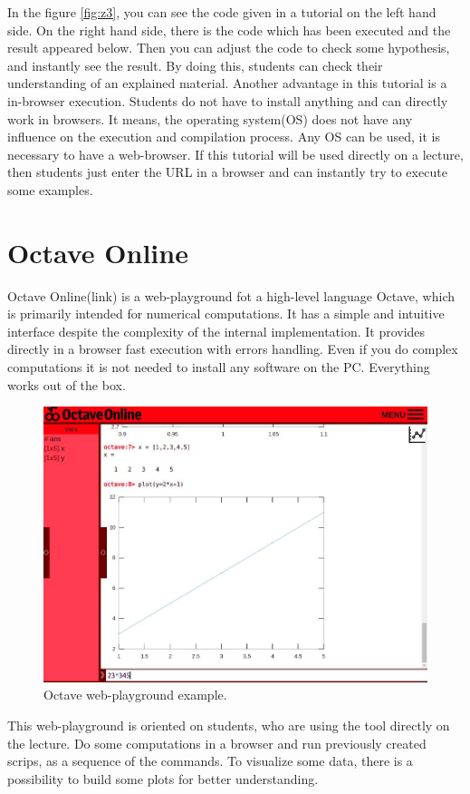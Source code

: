 In the figure \ref{fig:z3}, you can see the code given in a tutorial on the left hand side. On the right hand side, there is the code which has been executed and the result appeared below. Then you can adjust the code to check some hypothesis, and instantly see the result. By doing this, students can check their understanding of an explained material.
Another advantage in this tutorial is a in-browser execution. Students do not have to install anything and can directly work in browsers. It means, the operating system(OS) does not have any influence on the execution and compilation process. Any OS can be used, it is necessary to have a web-browser. If this tutorial will be used directly on a lecture, then students just enter the URL in a browser and can instantly try to execute some examples.

\section{Octave Online}
Octave Online(link) is a web-playground fot a high-level language Octave, which is primarily intended for numerical computations. It has a simple and intuitive interface despite the complexity of the internal implementation. It provides directly in a browser fast execution with errors handling. Even if you do complex computations it is not needed to install any software on the PC. Everything works out of the box.

\begin{figure}[h!]
    \centering
    \includegraphics[width=0.7\linewidth]{src/pic/octave}
    \caption{Octave web-playground example.}
    \label{fig:octave}
\end{figure}

This web-playground is oriented on students, who are using the tool directly on the lecture. Do some computations in a browser and run previously created scrips, as a sequence of the commands. To visualize some data, there is a possibility to build some plots for better understanding.

